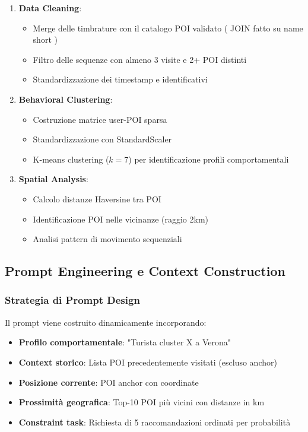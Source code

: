 \begin{enumerate}
\item \textbf{Data Cleaning}: 
   \begin{itemize}
   \item Merge delle timbrature con il catalogo POI validato ( JOIN fatto su name short )
   \item Filtro delle sequenze con almeno 3 visite e 2+ POI distinti
   \item Standardizzazione dei timestamp e identificativi
   \end{itemize}

\item \textbf{Behavioral Clustering}:
   \begin{itemize}
   \item Costruzione matrice user-POI sparsa
   \item Standardizzazione con StandardScaler
   \item K-means clustering ($k=7$) per identificazione profili comportamentali
   \end{itemize}

\item \textbf{Spatial Analysis}:
   \begin{itemize}
   \item Calcolo distanze Haversine tra POI
   \item Identificazione POI nelle vicinanze (raggio 2km)
   \item Analisi pattern di movimento sequenziali
   \end{itemize}
\end{enumerate}

\subsection{Prompt Engineering e Context Construction}

\subsubsection{Strategia di Prompt Design}

Il prompt viene costruito dinamicamente incorporando:

\begin{itemize}
\item \textbf{Profilo comportamentale}: "Turista cluster X a Verona"
\item \textbf{Context storico}: Lista POI precedentemente visitati (escluso anchor)  
\item \textbf{Posizione corrente}: POI anchor con coordinate
\item \textbf{Prossimità geografica}: Top-10 POI più vicini con distanze in km
\item \textbf{Constraint task}: Richiesta di 5 raccomandazioni ordinati per probabilità
\end{itemize}

